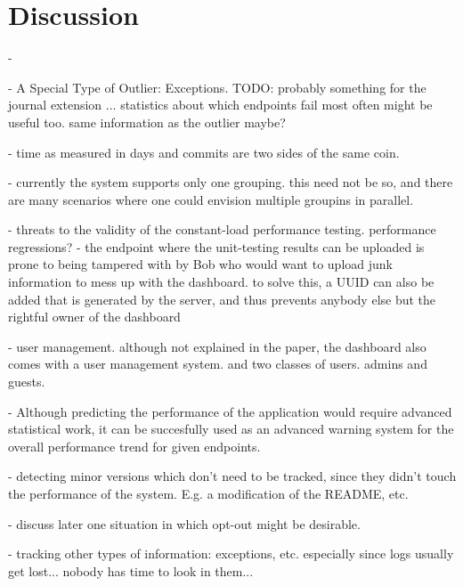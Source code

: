 
\section{Discussion}

-   


- A Special Type of Outlier: Exceptions. TODO: probably something for the journal extension ...
  statistics about which endpoints fail most often might be useful too.
  same information as the outlier maybe?

- time as measured in days and commits are two sides of the same coin. 

- currently the system supports only one grouping. this need not be so, and there are many scenarios where one could envision multiple groupins in parallel.

- threats to the validity of the constant-load performance testing. performance regressions? 
- the endpoint where the unit-testing results can be uploaded is prone to being tampered with by Bob who would want to upload junk information to mess up with the dashboard. to solve this, a UUID can also be added that is generated by the server, and thus prevents anybody else but the rightful owner of the dashboard 

- user management. although not explained in the paper, the dashboard also comes with a user management system. and two classes of users. admins and guests.

- Although predicting the performance of the application would require advanced statistical work, it can be succesfully used as an advanced warning system for the overall performance trend for given endpoints.

- detecting minor versions which don't need to be tracked, since they didn't touch the performance of the system. E.g. a modification of the README, etc. 

- discuss later one situation in which opt-out might be desirable. 

- tracking other types of information: exceptions, etc. especially since logs usually get lost... nobody has time to look in them...






